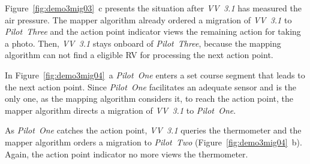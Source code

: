 Figure~\ref{fig:demo3mig03}~c presents the situation after \textit{VV~3.1} has measured the air pressure.
The mapper algorithm already ordered a migration of \textit{VV~3.1} to \textit{Pilot~Three} and
the action point indicator views the remaining action for taking a photo. 
%
Then, \textit{VV~3.1} stays onboard of \textit{Pilot~Three}, because the mapping algorithm can not find
a eligible \ac{RV} for processing the next action point. 

In Figure~\ref{fig:demo3mig04}~a \textit{Pilot~One} enters a set course segment that leads to the next
action point. Since \textit{Pilot~One} facilitates an adequate sensor and is the only one, as the mapping algorithm
considers it, to reach the action point, the mapper algorithm directs a migration of \textit{VV~3.1} to
\textit{Pilot~One}.

As \textit{Pilot~One} catches the action point, \textit{VV~3.1} queries the thermometer and the mapper
algorithm orders a migration to \textit{Pilot~Two} (Figure~\ref{fig:demo3mig04}~b).
Again, the action point indicator no more views the thermometer.

